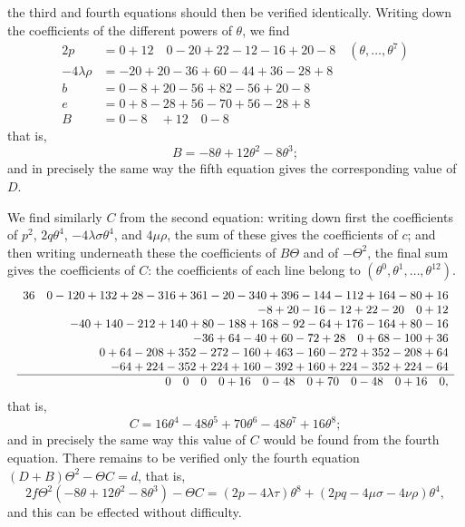 \documentclass[11pt]{article}
\begin{document}

\noindent the third and fourth equations should then be verified identically. Writing down the coefficients of the different powers of $\theta$, we find
\begin{align*}
2p &= 0 + 12 \quad 0 - 20 + 22 - 12 - 16 + 20 - 8\quad (\theta, \ldots, \theta^{7})\\
-4\lambda\rho &= -20 + 20 - 36 + 60 - 44 + 36 - 28 + 8\\
b &= 0 - 8 + 20 - 56 + 82 - 56 + 20 - 8\\
e &= 0 + 8 - 28 + 56 - 70 + 56 - 28 + 8\\
B &= 0 - 8 \quad + 12 \quad 0 - 8
\end{align*}
that is,
\[
B = -8\theta + 12\theta^{2} - 8\theta^{3};
\]
and in precisely the same way the fifth equation gives the corresponding value of $D$.

We find similarly $C$ from the second equation: writing down first the coefficients of $p^{2}$, $2q\theta^{4}$, $-4\lambda\sigma\theta^{4}$, and $4\mu\rho$, the sum of these gives the coefficients of $c$; and then writing underneath these the coefficients of $B\Theta$ and of $-\Theta^{2}$, the final sum gives the coefficients of $C$: the coefficients of each line belong to $(\theta^{0}, \theta^{1}, \ldots, \theta^{12})$.
\[
\resizebox{\textwidth}{!}{$\displaystyle
\begin{array}{r}
36\quad 0 - 120 + 132 + 28 - 316 + 361 - 20 - 340 + 396 - 144 - 112 + 164 - 80 + 16\\
-8 + 20 - 16 - 12 + 22 - 20 \quad 0 + 12 \\
-40 + 140 - 212 + 140 + 80 - 188 + 168 - 92 - 64 + 176 - 164 + 80 - 16\\
-36 + 64 - 40 + 60 - 72 + 28 \quad 0 + 68 - 100 + 36\\
0 + 64 - 208 + 352 - 272 - 160 + 463 - 160 - 272 + 352 - 208 + 64\\
-64 + 224 - 352 + 224 + 160 - 392 + 160 + 224 - 352 + 224 - 64\\
\hline
0\quad 0\quad 0\quad 0 + 16 \quad 0 - 48 \quad 0 + 70 \quad 0 - 48 \quad 0 + 16 \quad 0,
\end{array}$}
\]
that is,
\[
C = 16\theta^{4} - 48\theta^{5} + 70\theta^{6} - 48\theta^{7} + 16\theta^{8};
\]
and in precisely the same way this value of $C$ would be found from the fourth equation. There remains to be verified only the fourth equation $(D + B)\Theta^{2} - \Theta C = d$, that is,
\[
2f\Theta^{2}(-8\theta + 12\theta^{2} - 8\theta^{3}) - \Theta C = (2p - 4\lambda\tau)\theta^{8} + (2pq - 4\mu\sigma - 4\nu\rho)\theta^{4},
\]
and this can be effected without difficulty.
\end{document}
